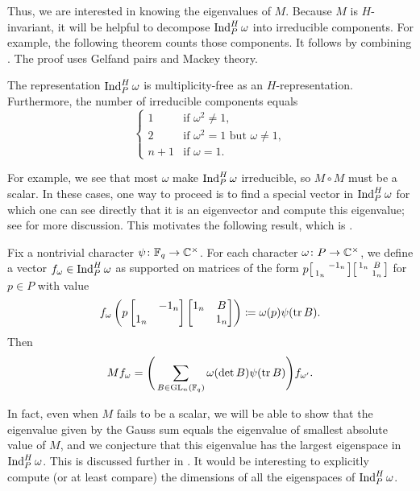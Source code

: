 \documentclass{amsart}
\begin{document}
Thus, we are interested in knowing the eigenvalues of $M$. Because $M$ is $H$-invariant, it will be helpful to decompose $\operatorname{Ind}_P^H\omega$ into irreducible components. For example, the following theorem counts those components. It follows by combining . The proof uses Gelfand pairs and Mackey theory.
\begin{theorem}
    The representation $\operatorname{Ind}_P^H\omega$ is multiplicity-free as an $H$-representation. %
    Furthermore, the number of irreducible components equals
    \[\begin{cases}
        1 & \text{if }\omega^2\ne1, \\
        2 & \text{if }\omega^2=1\text{ but }\omega\ne1, \\
        n+1 & \text{if }\omega=1.
    \end{cases}\]
\end{theorem}
For example, we see that most $\omega$ make $\operatorname{Ind}_P^H\omega$ irreducible, so $M\circ M$ must be a scalar. In these cases, one way to proceed is to find a special vector in $\operatorname{Ind}_P^H\omega$ for which one can see directly that it is an eigenvector and compute this eigenvalue; see \cite[Section~3.6]{chang-doubling} for more discussion. This motivates the following result, which is .
\begin{theorem}
    Fix a nontrivial character $\psi\colon\mathbb F_q\to\mathbb C^\times$. For each character $\omega\colon P\to\mathbb C^\times$, we define a vector $f_\omega\in\operatorname{Ind}_P^H\omega$ as supported on matrices of the form $p\begin{bsmallmatrix}
        & -1_n \\ 1_n
    \end{bsmallmatrix}\begin{bsmallmatrix}
        1_n & B \\ & 1_n
    \end{bsmallmatrix}$ for $p\in P$ with value
    \[f_\omega\left(p\begin{bmatrix}
        & -1_n \\ 1_n
    \end{bmatrix}\begin{bmatrix}
        1_n & B \\ & 1_n
    \end{bmatrix}\right)\coloneqq\omega(p)\psi(\operatorname{tr} B).\]
    Then
    \[Mf_\omega=\Bigg(\sum_{B\in\mathrm{GL}_n(\mathbb F_q)}\omega(\det B)\psi(\operatorname{tr} B)\Bigg)f_{\omega'}.\]
\end{theorem}
\begin{remark}
    In fact, even when $M$ fails to be a scalar, we will be able to show that the eigenvalue given by the Gauss sum equals the eigenvalue of smallest absolute value of $M$, and we conjecture that this eigenvalue has the largest eigenspace in $\operatorname{Ind}_P^H\omega$. This is discussed further in . It would be interesting to explicitly compute (or at least compare) the dimensions of all the eigenspaces of $\operatorname{Ind}_P^H\omega$.
\end{remark}
\end{document}
